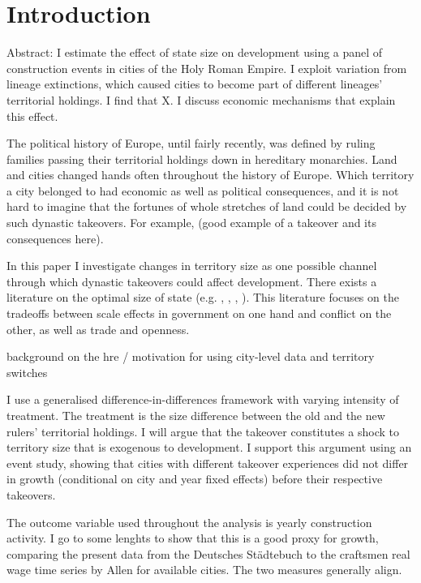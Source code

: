 \documentclass{article}
\begin{document}
\newpage

\setcounter{page}{1}
 
\section{Introduction}

Abstract: I estimate the effect of state size on development using a panel of construction events in cities of the Holy Roman Empire. I exploit variation from lineage extinctions, which caused cities to become part of different lineages' territorial holdings. I find that X. I discuss economic mechanisms that explain this effect.

The political history of Europe, until fairly recently, was defined by ruling families passing their territorial holdings down in hereditary monarchies. Land and cities changed hands often throughout the history of Europe. Which territory a city belonged to had economic as well as political consequences, and it is not hard to imagine that the fortunes of whole stretches of land could be decided by such dynastic takeovers. For example, (good example of a takeover and its consequences here).

In this paper I investigate changes in territory size as one possible channel through which dynastic takeovers could affect development. There exists a literature on the optimal size of state (e.g. \cite{as1997}, \cite{aw1998}, \cite{asw2000}, \cite{easterly2000}). This literature focuses on the tradeoffs between scale effects in government on one hand and conflict on the other, as well as trade and openness.

background on the hre / motivation for using city-level data and territory switches

I use a generalised difference-in-differences framework with varying intensity of treatment. The treatment is the size difference between the old and the new rulers' territorial holdings. I will argue that the takeover constitutes a shock to territory size that is exogenous to development. I support this argument using an event study, showing that cities with different takeover experiences did not differ in growth (conditional on city and year fixed effects) before their respective takeovers. 

The outcome variable used throughout the analysis is yearly construction activity. I go to some lenghts to show that this is a good proxy for growth, comparing the present data from the Deutsches St\"adtebuch to the craftsmen real wage time series by Allen for available cities. The two measures generally align.
\end{document}
